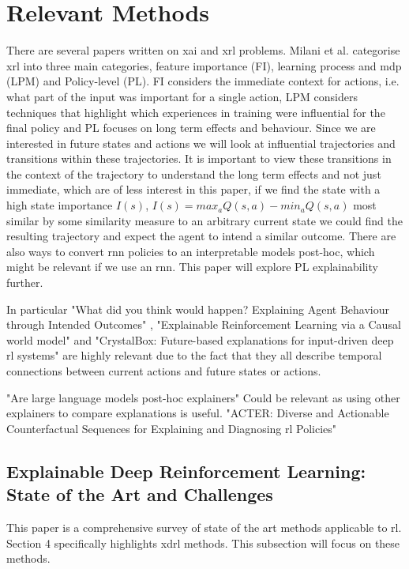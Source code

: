 \documentclass[UKenglish]{uiomasterthesis}
\begin{document}
\section{Relevant Methods}
There are several papers written on \ac{xai} and \ac{xrl} problems. Milani et al.\cite{milani2022survey} categorise \ac{xrl} into three main categories, feature importance (FI), learning process and \ac{mdp} (LPM) and Policy-level (PL). FI considers the immediate context for actions, i.e. what part of the input was important for a single action, LPM considers techniques that highlight which experiences in training were influential for the final policy and PL focuses on long term effects and behaviour. Since we are interested in future states and actions we will look at influential trajectories and transitions within these trajectories. It is important to view these transitions in the context of the trajectory to understand the long term effects and not just immediate, which are of less interest in this paper, if we find the state with a high state importance $I(s)$, $I(s) = max_aQ(s,a)-min_aQ(s,a)$ most similar by some similarity measure to an arbitrary current state we could find the resulting trajectory and expect the agent to intend a similar outcome. There are also ways to convert \ac{rnn} policies to an interpretable models post-hoc, which might be relevant if we use an \ac{rnn}. This paper will explore PL explainability further.

In particular "What did you think would happen? Explaining Agent Behaviour through Intended Outcomes" \cite{yau2020did}, "Explainable Reinforcement Learning via a Causal world model" \cite{yu2024explainable} and "CrystalBox: Future-based explanations for input-driven deep \ac{rl} systems" \cite{patel2024crystalbox} are highly relevant due to the fact that they all describe temporal connections between current actions and future states or actions.

"Are large language models post-hoc explainers" \cite{kroeger2024large} Could be relevant as using other explainers to compare explanations is useful. "ACTER: Diverse and Actionable Counterfactual Sequences for Explaining and Diagnosing \ac{rl} Policies" \cite{gajcin2024acter} 

\subsection{Explainable Deep Reinforcement Learning: State of the Art and Challenges}
This paper is a comprehensive survey of state of the art methods applicable to \ac{rl}. Section 4 specifically highlights \ac{xdrl} methods. This subsection will focus on these methods.
\end{document}
